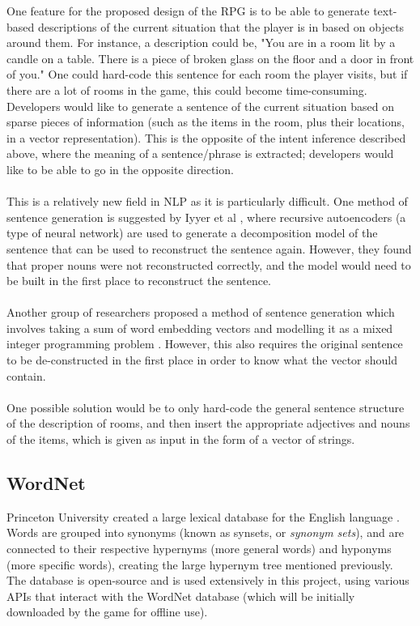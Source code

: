 \documentclass[12pt]{article}
\begin{document}
One feature for the proposed design of the RPG is to be able to generate text-based descriptions of the current situation that the player is in based on objects around them. For instance, a description could be, "You are in a room lit by a candle on a table. There is a piece of broken glass on the floor and a door in front of you." One could hard-code this sentence for each room the player visits, but if there are a lot of rooms in the game, this could become time-consuming. Developers would like to generate a sentence of the current situation based on sparse pieces of information (such as the items in the room, plus their locations, in a vector representation). This is the opposite of the intent inference described above, where the meaning of a sentence/phrase is extracted; developers would like to be able to go in the opposite direction.
\\
\\
This is a relatively new field in NLP as it is particularly difficult. One method of sentence generation is suggested by Iyyer et al \cite{RefWorks:55}, where recursive autoencoders (a type of neural network) are used to generate a decomposition model of the sentence that can be used to reconstruct the sentence again. However, they found that proper nouns were not reconstructed correctly, and the model would need to be built in the first place to reconstruct the sentence.
\\
\\
Another group of researchers proposed a method of sentence generation which involves taking a sum of word embedding vectors and modelling it as a mixed integer programming problem \cite{RefWorks:54}. However, this also requires the original sentence to be de-constructed in the first place in order to know what the vector should contain.
\\
\\
One possible solution would be to only hard-code the general sentence structure of the description of rooms, and then insert the appropriate adjectives and nouns of the items, which is given as input in the form of a vector of strings.

\subsection{WordNet}

Princeton University created a large lexical database for the English language \cite{RefWorks:20}. Words are grouped into synonyms (known as synsets, or \textit{synonym sets}), and are connected to their respective hypernyms (more general words) and hyponyms (more specific words), creating the large hypernym tree mentioned previously. The database is open-source and is used extensively in this project, using various APIs that interact with the WordNet database (which will be initially downloaded by the game for offline use).
\end{document}

